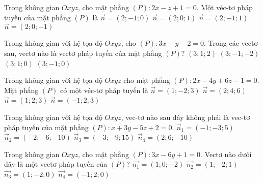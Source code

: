 \begin{ex}%
	Trong không gian $Oxyz$, cho mặt phẳng $(P)\colon 2x-z+1=0$. Một véc-tơ pháp tuyến của mặt phẳng $ (P) $ là
	\choice
	{$ \overrightarrow{n}=(2;-1;0) $}
	{$ \overrightarrow{n}=(2;0;1) $}
	{$ \overrightarrow{n}=(2;-1;1) $}
	{\True $ \overrightarrow{n}=(2;0;-1) $}
\end{ex}
\begin{ex}%
	Trong không gian với hệ tọa độ $Oxyz$,  cho  $(P)\colon 3x-y-2=0$. Trong các vectơ sau, vectơ nào là vectơ pháp tuyến của mặt phẳng $(P)$?
	\choice
	{$(3;1;2)$}
	{$(3;-1;-2)$}
	{$(3;1;0)$}
	{\True $(3;-1;0)$}
\end{ex}
\begin{ex}%
	Trong không gian với hệ tọa độ $Oxyz$ cho mặt phẳng $(P)\colon 2x-4y+6z-1=0$. Mặt phẳng $(P)$ có một véc-tơ pháp tuyến là
	\choice
	{\True $\vec{n}=(1;-2;3)$}
	{$\vec{n}=(2;4;6)$}
	{$\vec{n}=(1;2;3)$}
	{$\vec{n}=(-1;2;3)$}
\end{ex}
\begin{ex}%
	Trong không gian với hệ tọa độ $Oxyz$, vec-tơ nào sau đây không phải là vec-tơ pháp tuyến của mặt phẳng $(P):x+3y-5z+2=0$.
	\choice
	{$\overrightarrow{n}_1=(-1;-3;5)$}
	{\True $\overrightarrow{n}_2=(-2;-6;-10)$}
	{$\overrightarrow{n}_3=(-3;-9;15)$}
	{$\overrightarrow{n}_4=(2;6;-10)$}
\end{ex}
\begin{ex}%
	Trong không gian $Oxyz$, cho mặt phẳng $(P)\colon 3x-6y+1=0$. Vectơ nào dưới đây là một vectơ pháp tuyến của $(P)$?
	\choice
	{ $\vec{n_1}=(1;0;-2)$}
	{$\vec{n_2}=(1;-2;1)$}
	{\True $\vec{n_3}=(1;-2;0)$}
	{$\vec{n_4}=(-1;2;0)$}
\end{ex}
